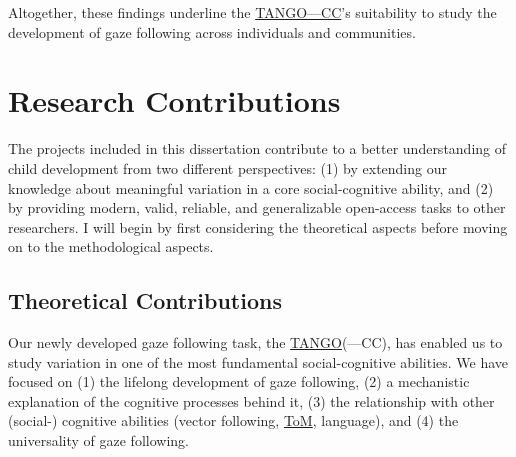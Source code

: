\documentclass[
]{scrbook}
\begin{document}
Altogether, these findings underline the \hyperref[acronyms_TANGOux2014CC]{TANGO---CC}'s suitability to study the development of gaze following across individuals and communities.

\section{Research Contributions}\label{research-contributions}

The projects included in this dissertation contribute to a better understanding of child development from two different perspectives: (1) by extending our knowledge about meaningful variation in a core social-cognitive ability, and (2) by providing modern, valid, reliable, and generalizable open-access tasks to other researchers. I will begin by first considering the theoretical aspects before moving on to the methodological aspects.

\subsection{Theoretical Contributions}\label{theoreticalcontributions}

Our newly developed gaze following task, the \hyperref[acronyms_TANGO]{TANGO}(---CC), has enabled us to study variation in one of the most fundamental social-cognitive abilities. We have focused on (1) the lifelong development of gaze following, (2) a mechanistic explanation of the cognitive processes behind it, (3) the relationship with other (social-) cognitive abilities (vector following, \hyperref[acronyms_ToM]{ToM}, language), and (4) the universality of gaze following.
\end{document}
